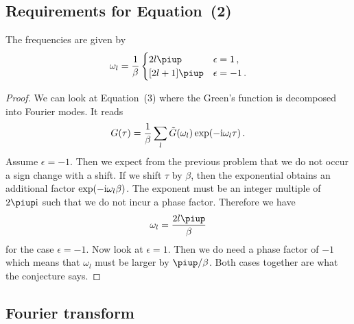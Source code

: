 \documentclass[11pt, english, fleqn, DIV=15, headinclude, BCOR=1cm]{scrartcl}
\begin{document}
\needspace{4cm}
\subsection{Requirements for Equation~(2)}

\begin{theorem}
    The frequencies are given by
    \[
        \omega_l = \frac 1 \beta
        \begin{cases}
            2 l \piup & \epsilon = 1 \,, \\
            [2 l + 1] \piup & \epsilon = -1 \,.
        \end{cases}
    \]
\end{theorem}

\begin{proof}
    We can look at Equation~(3) where the Green's function is decomposed into
    Fourier modes. It reads
    \[
        G(\tau) = \frac 1 \beta \sum_l \tilde G(\omega_l) \exp(- \mathrm i \omega_l
        \tau) \,.
    \]
    Assume $\epsilon = -1$. Then we expect from the previous problem that we do
    not occur a sign change with a shift. If we shift $\tau$ by $\beta$, then
    the exponential obtains an additional factor $\exp(-\mathrm i \omega_l \beta)$.
    The exponent must be an integer multiple of $2 \piup \iup$ such that we do
    not incur a phase factor. Therefore we have
    \[
        \omega_l = \frac{2 l \piup}{\beta}
    \]
    for the case $\epsilon = -1$. Now look at $\epsilon = 1$. Then we do need a
    phase factor of $-1$ which means that $\omega_l$ must be larger by
    $\piup/\beta$. Both cases together are what the conjecture says.
\end{proof}

\subsection{Fourier transform}
\end{document}
